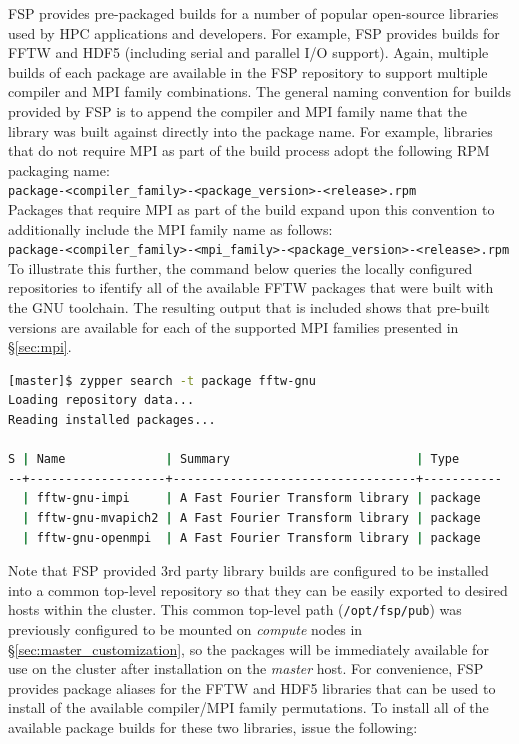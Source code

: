 \documentclass[letterpaper]{article}
\begin{document}
FSP provides pre-packaged builds for a number of popular open-source libraries
used by HPC applications and developers. For example, FSP provides builds for
FFTW and HDF5 (including serial and parallel I/O support). Again, multiple
builds of each package are available in the FSP repository to support multiple
compiler and MPI family combinations. The general naming convention for builds
provided by FSP is to append the compiler and MPI family name that the library
was built against directly into the package name. For example, libraries that
do not require MPI as part of the build process adopt the following RPM
packaging name: \\

\noindent
\texttt{package-<compiler\_family>-<package\_version>-<release>.rpm} \\

\noindent Packages that require MPI as part of the build expand upon this convention to
additionally include the MPI family name as follows: \\

\noindent
\texttt{package-<compiler\_family>-<mpi\_family>-<package\_version>-<release>.rpm} \\

To illustrate this further, the command below queries the locally configured
repositories to ifentify all of the available FFTW packages that were built
with the GNU toolchain. The resulting output that is included shows that
pre-built versions are available for each of the supported MPI families
presented in \S\ref{sec:mpi}.

\begin{lstlisting}[language=bash]
[master]$ zypper search -t package fftw-gnu
Loading repository data...
Reading installed packages...

S | Name              | Summary                          | Type      
--+-------------------+----------------------------------+-----------
  | fftw-gnu-impi     | A Fast Fourier Transform library | package   
  | fftw-gnu-mvapich2 | A Fast Fourier Transform library | package   
  | fftw-gnu-openmpi  | A Fast Fourier Transform library | package   
\end{lstlisting}

Note that FSP provided 3rd party library builds are configured to be installed
into a common top-level repository so that they can be easily exported to
desired hosts within the cluster. This common top-level path (\texttt{/opt/fsp/pub})
was previously configured to be mounted on {\em compute} nodes in
\S\ref{sec:master_customization}, so the packages will be immediately available
for use on the cluster after installation on the {\em master} host.  For
convenience, FSP provides package aliases for the FFTW and HDF5 libraries that
can be used to install of the available compiler/MPI family permutations. To
install all of the available package builds for these two libraries, issue the
following:
\end{document}

